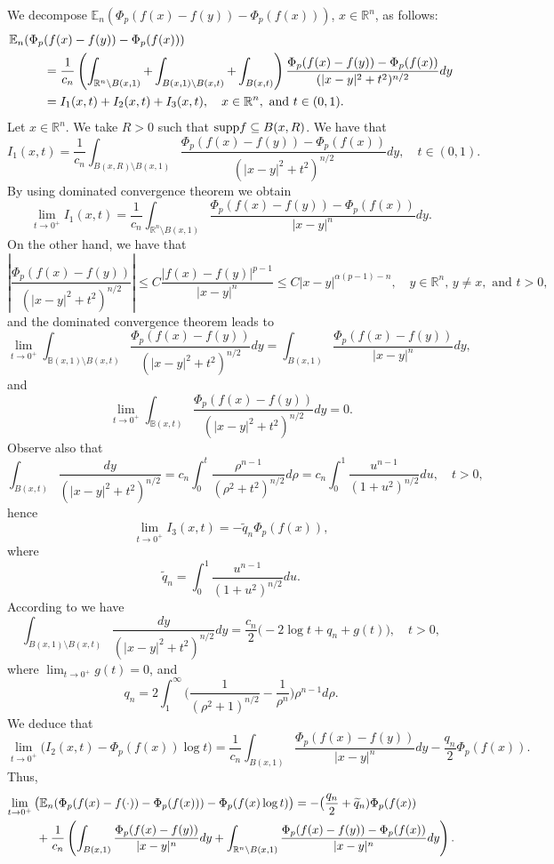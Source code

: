\documentclass[a4paper,10pt, reqno]{amsart}
\theoremstyle{definition}
\theoremstyle{remark}
\numberwithin{equation}{section}
\begin{document}
{We decompose ${\mathbb E}_n(\Phi _p(f(x)-f(y))-\Phi _p(f(x)))$, $x\in \mathbb R^n$, as follows:
\begin{align*}
{\mathbb E}_n(\Phi _p(f(x)-f(y))-\Phi _p(f(x)))&\\
&\hspace{-4cm}=\frac{1}{c_n}\left(\int_{\mathbb R^n\setminus B(x,1)}+ \int_{B(x,1)\setminus B(x,t)}+\int_{B(x,t)}\right)\frac{\Phi _p(f(x)-f(y))-\Phi _p(f(x))}{(|x-y|^2+t^2)^{n/2}}dy\\
&\hspace{-4cm}=I_1(x,t)+I_2(x,t)+I_3(x,t),\quad x\in \mathbb R^n, \mbox{ and }t\in (0,1).
\end{align*}
Let $x\in \mathbb R^n$. We take $R>0$ such that ${\rm supp }f\subseteq B(x,R)$. We have that
$$
I_1(x,t)=\frac{1}{c_n}\int_{B(x,R)\setminus B(x,1)}\frac{\Phi _p(f(x)-f(y))-\Phi _p(f(x))}{(|x-y|^2+t^2)^{n/2}}dy,\quad t\in (0,1).
$$
By using dominated convergence theorem we obtain
$$
\lim_{t\rightarrow 0^+}I_1(x,t)=\frac{1}{c_n}\int_{\mathbb R^n\setminus B(x,1)}\frac{\Phi _p(f(x)-f(y))-\Phi _p(f(x))}{|x-y|^n}dy.
$$
On the other hand, we have that
$$
\left|\frac{\Phi _p(f(x)-f(y))}{(|x-y|^2+t^2)^{n/2}}\right|\leq C\frac{|f(x)-f(y)|^{p-1}}{|x-y|^n}\leq C|x-y|^{\alpha (p-1)-n},\quad y\in \mathbb R^n,\,y\not=x,\mbox{ and }t>0,
$$
and the dominated convergence theorem leads to 
$$
\lim_{t\rightarrow 0^+}\int_{\mathbb B(x,1)\setminus B(x,t)}\frac{\Phi _p(f(x)-f(y))}{(|x-y|^2+t^2)^{n/2}}dy=\int_{B(x,1)}\frac{\Phi _p(f(x)-f(y))}{|x-y|^n}dy,
$$
and
$$
\lim_{t\rightarrow 0^+}\int_{\mathbb B(x,t)}\frac{\Phi _p(f(x)-f(y))}{(|x-y|^2+t^2)^{n/2}}dy=0.
$$
Observe also that
$$
\int_{B(x,t)}\frac{dy}{(|x-y|^2+t^2)^{n/2}}=c_n\int_0^t\frac{\rho ^{n-1}}{(\rho ^2+t^2)^{n/2}}d\rho=c_n\int_0^1\frac{u^{n-1}}{(1+u^2)^{n/2}}du,\quad t>0, 
$$
hence
$$
\lim_{t\rightarrow 0^+}I_3(x,t)=-\widetilde{q}_n\Phi_p(f(x)),
$$
where 
$$
\widetilde{q}_n=\int_0^1\frac{u^{n-1}}{(1+u^2)^{n/2}}du.
$$ 
According to \cite[Lemma 4.1]{CHW} we have
$$
\int_{B(x,1)\setminus B(x,t)}\frac{dy}{(|x-y|^2+t^2)^{n/2}}dy=\frac{c_n}{2}\big(-2\log t+q_n+g(t)\big),\quad t>0,
$$
where $\lim_{t\rightarrow 0^+}g(t)=0$, and 
$$
q_n=2\int_1^\infty \Big(\frac{1}{(\rho ^2+1)^{n/2}}-\frac{1}{\rho ^n}\Big)\rho ^{n-1}d\rho.
$$
We deduce that
$$
\lim_{t\rightarrow 0^+}\big(I_2(x,t)-\Phi_p(f(x))\log t\big)=\frac{1}{c_n}\int_{B(x,1)}\frac{\Phi _p(f(x)-f(y))}{|x-y|^n}dy-\frac{q_n}{2}\Phi _p(f(x)).
$$
Thus,  
\begin{align*}
\lim_{t\rightarrow 0^+}\big({\mathbb E}_n(\Phi _p(f(x)-f(\cdot))-\Phi _p(f(x)))-\Phi_p(f(x)\log t)\big)&=-\big(\frac{q_n}{2}+\widetilde{q}_n)\Phi _p(f(x))\\
&\hspace{-8cm}\quad +\frac{1}{c_n}\left(\int_{B(x,1)}\frac{\Phi _p(f(x)-f(y))}{|x-y|^n}dy+\int_{\mathbb R^n\setminus B(x,1)}\frac{\Phi _p(f(x)-f(y))-\Phi _p(f(x))}{|x-y|^n}dy\right).
\end{align*}

}
\end{document}
